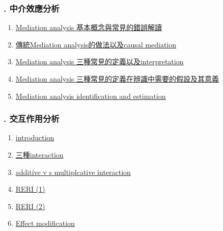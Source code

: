 \documentclass[11pt]{article}
\begin{document}
\vspace{-1cm}

\subsubsection*{. 中介效應分析}

\vspace{-0.5cm}

\begin{enumerate}
	\item \href{https://mp.weixin.qq.com/s/QVo-71WwLWt99ljKQOtXtg}{Mediation analysis 基本概念與常見的錯誤解讀}	%
	\item \href{https://mp.weixin.qq.com/s/tzJnVwOSfnCNbJtr9ksGUQ}{傳統Mediation analysis的做法以及causal mediation}	%
	\item \href{https://mp.weixin.qq.com/s/KPbpaspmIonZpCDdAFJbpQ}{Mediation analysis 三種常見的定義以及interpretation}	%
	\item \href{https://mp.weixin.qq.com/s/AoNnTWP3dMCCcmskwfvJ0g}{Mediation analysis 三種常見的定義在辨識中需要的假設及其意義}	%
	\item \href{https://mp.weixin.qq.com/s/9hUGxYCy_a8UWkwXy78tAw}{Mediation analysis identification and estimation}	%
\end{enumerate}

\vspace{-1cm}

\subsubsection*{. 交互作用分析}

\vspace{-0.5cm}

\begin{enumerate}
	\item \href{https://mp.weixin.qq.com/s/E7txm3jtXFuGbGS_b9yMFw}{introduction}	%
	\item \href{https://mp.weixin.qq.com/s/t51Bs8d73iR8unozout9yA}{三種interaction}	%
	\item \href{https://mp.weixin.qq.com/s/zcVLsoAjGCEkPOF5eASvjA}{additive v s multiplcative interaction}	%
	\item \href{https://mp.weixin.qq.com/s/OVingr4LK-R979zHzAG3NA}{RERI (1)}	%
	\item \href{https://mp.weixin.qq.com/s/RfIYqjLL90LQLCB0eryeLA}{RERI (2)}	%
	\item \href{https://mp.weixin.qq.com/s/VW9h_Bztrchcg3tMyBM8zA}{Effect modification}	%
\end{enumerate}
\end{document}
